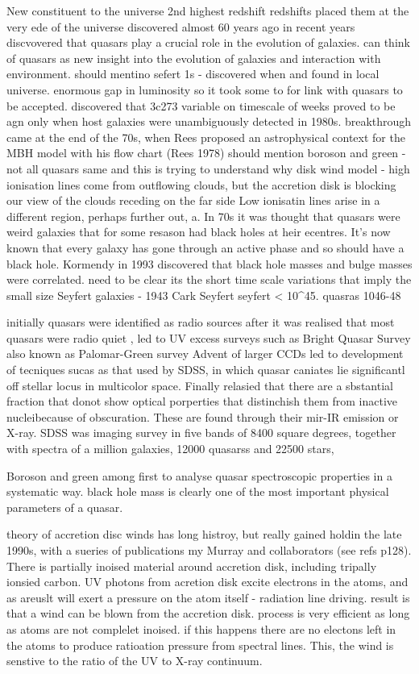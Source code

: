 New constituent to the universe
2nd highest redshift
redshifts placed them at the very ede of the universe 
discovered almost 60 years ago
in recent years discvovered that quasars play a crucial role in the evolution of galaxies. can think of quasars as new insight into the evolution of galaxies and interaction with environment. 
should mentino sefert 1s - discovered when and found in local universe. enormous gap in luminosity so it took some to for link with quasars to be accepted. 
discovered that 3c273 variable on timescale of weeks 
proved to be agn only when host galaxies were unambiguously detected in 1980s. 
breakthrough came at the end of the 70s, when Rees proposed an astrophysical context for the MBH model with his flow chart (Rees 1978)
should mention boroson and green - not all quasars same and this is trying to understand why 
disk wind model - high ionisation lines come from outflowing clouds, but the accretion disk is blocking our view of the clouds receding on the far side
Low ionisatin lines arise in a different region, perhaps further out, a. 
In 70s it was thought that quasars were weird galaxies that for some resason had black holes at heir ecentres. 
It's now known that every galaxy has gone through an active phase and so should have a black hole. 
Kormendy in 1993 discovered that black hole masses and bulge masses were correlated. 
need to be clear its the short time scale variations that imply the small size
Seyfert galaxies - 1943 Cark Seyfert
seyfert < 10^45. quasras 1046-48

initially quasars were identified as radio sources
after it was realised that most quasars were radio quiet , led to UV excess surveys such as Bright Quasar Survey also known as Palomar-Green survey
Advent of larger CCDs led to development of tecniques sucas as that used by SDSS, in which quasar caniates lie significantl off stellar locus in multicolor space. 
Finally relasied that there are a sbstantial fraction that donot show optical porperties that distinchish them from inactive nucleibecause of obscuration. 
These are found through their mir-IR emission or X-ray. 
SDSS was imaging survey in five bands of 8400 square degrees, together with spectra of a million galaxies, 12000 quasarss and 22500 stars, 

Boroson and green among first to analyse quasar spectroscopic properties in a systematic way.
black hole mass is clearly one of the most important physical parameters of a quasar. 

theory of accretion disc winds has long histroy, but really gained holdin the late 1990s, with a sueries of publications my Murray and collaborators (see refs p128). There is partially inoised material around accretion disk, including tripally ionsied carbon. UV photons from acretion disk excite electrons in the atoms, and as areuslt will exert a pressure on the atom itself - radiation line driving.  result is that a wind can be blown from the accretion disk. process is very efficient as long as atoms are not complelet inoised. if this happens there are no electons left in the atoms to produce ratioation pressure from spectral lines. This, the wind is senstive to the ratio of the UV to X-ray continuum. 

